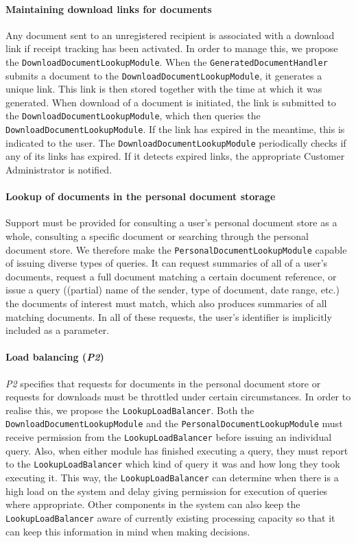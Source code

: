 \documentclass[a4paper,10pt]{article}
\begin{document}
\paragraph{Maintaining download links for documents}
Any document sent to an unregistered recipient is associated with a download link if receipt tracking has been activated. In order to manage this, we propose the \texttt{DownloadDocumentLookupModule}. When the \texttt{GeneratedDocumentHandler} submits a document to the \texttt{DownloadDocumentLookupModule}, it generates a unique link. This link is then stored together with the time at which it was generated. When download of a document is initiated, the link is submitted to the \texttt{DownloadDocumentLookupModule}, which then queries the \texttt{DownloadDocumentLookupModule}. If the link has expired in the meantime, this is indicated to the user. The \texttt{DownloadDocumentLookupModule} periodically checks if any of its links has expired. If it detects expired links, the appropriate Customer Administrator is notified.

\paragraph{Lookup of documents in the personal document storage}
Support must be provided for consulting a user's personal document store as a whole, consulting a specific document or searching through the personal document store. We therefore make the \texttt{PersonalDocumentLookupModule} capable of issuing diverse types of queries. It can request summaries of all of a user's documents, request a full document matching a certain document reference, or issue a query ((partial) name of the sender, type of document, date range, etc.) the documents of interest must match, which also produces summaries of all matching documents. In all of these requests, the user's identifier is implicitly included as a parameter.

\paragraph{Load balancing (\emph{P2})}
\emph{P2} specifies that requests for documents in the personal document store or requests for downloads must be throttled under certain circumstances. In order to realise this, we propose the \texttt{LookupLoadBalancer}. Both the \texttt{DownloadDocumentLookupModule} and the \texttt{PersonalDocumentLookupModule} must receive permission from the \texttt{LookupLoadBalancer} before issuing an individual query. Also, when either module has finished executing a query, they must report to the \texttt{LookupLoadBalancer} which kind of query it was and how long they took executing it. This way, the \texttt{LookupLoadBalancer} can determine when there is a high load on the system and delay giving permission for execution of queries where appropriate. Other components in the system can also keep the \texttt{LookupLoadBalancer} aware of currently existing processing capacity so that it can keep this information in mind when making decisions.
\end{document}
